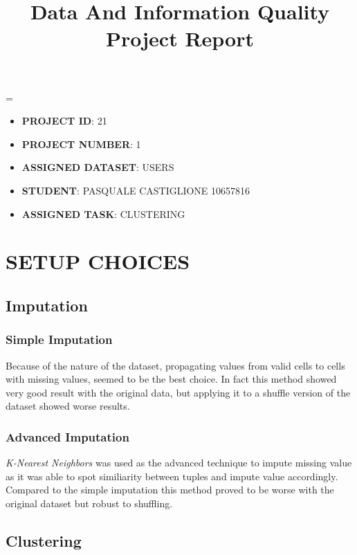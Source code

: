 \documentclass{article}
\title{
	\vspace{4cm}
	\textbf{Data And Information Quality Project Report}\\
}
\author{}
\date{}
\newcommand{\justified}
{
	\tolerance=1
	\emergencystretch=\maxdimen
	\hyphenpenalty=10000
	\hbadness=10000
}
\begin{document}
\maketitle
\vfill
\justified
\begin{itemize}
	\item\textbf{PROJECT ID}: 21
	\item\textbf{PROJECT NUMBER}: 1
	\item\textbf{ASSIGNED DATASET}: USERS
	\item\textbf{STUDENT}: PASQUALE CASTIGLIONE 10657816
	\item\textbf{ASSIGNED TASK}: CLUSTERING
\end{itemize}

\newpage

\tableofcontents

\newpage



\section{SETUP CHOICES}

\subsection{Imputation}

\subsubsection{Simple Imputation}
Because of the nature of the dataset, propagating values from valid cells to cells with missing values, seemed to be the best choice. In fact this method showed very good result with the original data, but applying it to a shuffle version of the dataset showed worse results.  

\subsubsection{Advanced Imputation}
\emph{K-Nearest Neighbors} was used as the advanced technique to impute missing value as it was able to spot similiarity between tuples and impute value accordingly. Compared to the simple imputation this method proved to be worse with the original dataset but robust to shuffling.

\subsection{Clustering}
\end{document}
